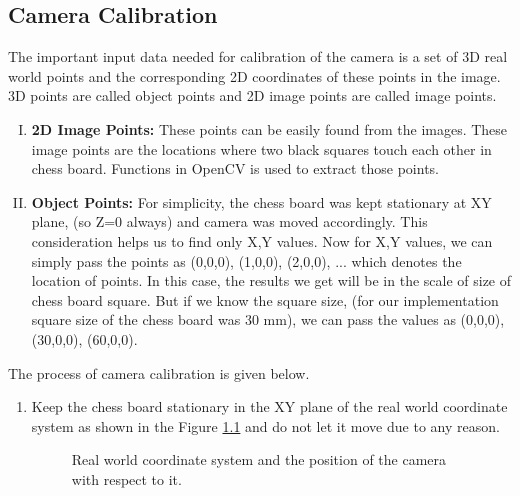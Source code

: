 \documentclass[a4paper,12pt]{report}%
\begin{document}
\begin{appendices}
	\chapter{Camera Calibration} \label{Camera Calibration}
	
	The important input data needed for calibration of the camera is a set of 3D real world points and the corresponding 2D coordinates of these points in the image. 3D points are called object points and 2D image points are called image points.
	
	\begin{enumerate}[I.]
		\item \textbf{2D Image Points:} These points can be easily found from the images. These image points are the locations where two black squares touch each other in chess board. Functions in OpenCV is used to extract those points\cite{cam_calib:_nodate}.
		
		\item \textbf{Object Points:}  For simplicity, the chess board was kept stationary at XY plane, (so Z=0 always) and camera was moved accordingly. This consideration helps us to find only X,Y values. Now for X,Y values, we can simply pass the points as (0,0,0), (1,0,0), (2,0,0), ... which denotes the location of points. In this case, the results we get will be in the scale of size of chess board square\cite{cam_calib:_nodate}. But if we know the square size, (for our implementation square size of the chess board was 30 mm), we can pass the values as (0,0,0), (30,0,0), (60,0,0).
	\end{enumerate}
	
	The process of camera calibration is given below.
	
	\begin{enumerate}
		\item Keep the chess board stationary in the XY plane of the real world coordinate system as shown in the Figure \ref{fig:clib3dworld} and do not let it move due to any reason.
		
		\begin{figure}[h]
			\centering
			\caption{Real world coordinate system and the position of the camera with respect to it. }
			\label{fig:clib3dworld}
		\end{figure}
		

\end{enumerate}
\end{appendices}
\end{document}
